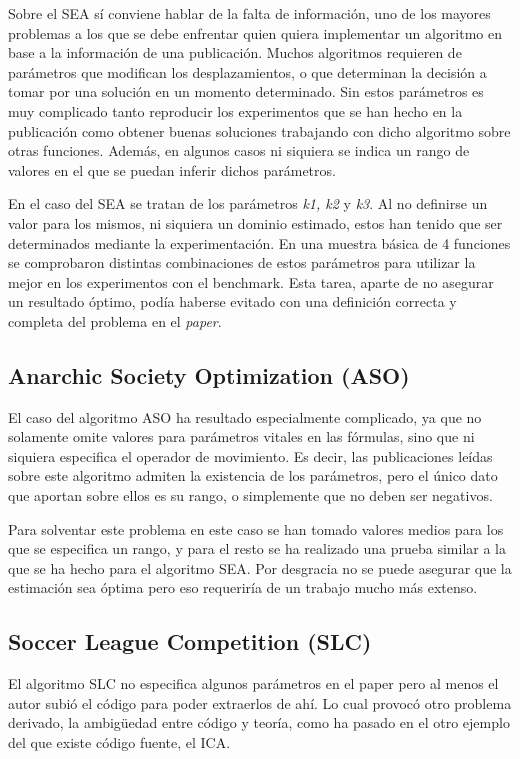 Sobre el SEA sí conviene hablar de la falta de información, uno de los mayores problemas a los que se debe enfrentar quien quiera implementar un algoritmo en base a la información de una publicación. Muchos algoritmos requieren de parámetros que modifican los desplazamientos, o que determinan la decisión a tomar por una solución en un momento determinado. Sin estos parámetros es muy complicado tanto reproducir los experimentos que se han hecho en la publicación como obtener buenas soluciones trabajando con dicho algoritmo sobre otras funciones. Además, en algunos casos ni siquiera se indica un rango de valores en el que se puedan inferir dichos parámetros.

En el caso del SEA se tratan de los parámetros \textit{k1, k2} y \textit{k3}. Al no definirse un valor para los mismos, ni siquiera un dominio estimado, estos han tenido que ser determinados mediante la experimentación. En una muestra básica de 4 funciones se comprobaron distintas combinaciones de estos parámetros para utilizar la mejor en los experimentos con el benchmark. Esta tarea, aparte de no asegurar un resultado óptimo, podía haberse evitado con una definición correcta y completa del problema en el \textit{paper}.

\subsection{Anarchic Society Optimization (ASO)}

El caso del algoritmo ASO ha resultado especialmente complicado, ya que no solamente omite valores para parámetros vitales en las fórmulas, sino que ni siquiera especifica el operador de movimiento. Es decir, las publicaciones leídas sobre este algoritmo admiten la existencia de los parámetros, pero el único dato que aportan sobre ellos es su rango, o simplemente que no deben ser negativos.

Para solventar este problema en este caso se han tomado valores medios para los que se especifica un rango, y para el resto se ha realizado una prueba similar a la que se ha hecho para el algoritmo SEA. Por desgracia no se puede asegurar que la estimación sea óptima pero eso requeriría de un trabajo mucho más extenso.

\subsection{Soccer League Competition (SLC)}

El algoritmo SLC no especifica algunos parámetros en el paper pero al menos el autor subió el código para poder extraerlos de ahí. Lo cual provocó otro problema derivado, la ambigüedad entre código y teoría, como ha pasado en el otro ejemplo del que existe código fuente, el ICA.

